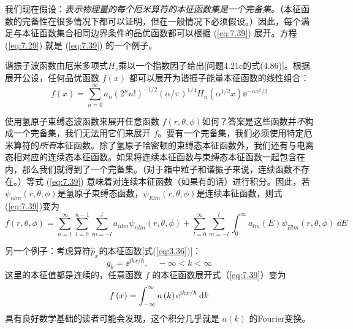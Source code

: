     我们现在假设：\textit{表示物理量的每个厄米算符的本征函数集是一个完备集。}（本征函数的完备性在很多情况下都可以证明，但在一般情况下必须假设。）因此，每个满足与本征函数集合相同边界条件的品优函数都可以根据 (\ref{eq:7.39}) 展开。方程 (\ref{eq:7.29}) 就是 (\ref{eq:7.39}) 的一个例子。

    谐振子波函数由厄米多项式$H_v$乘以一个指数因子给出[问题4.21c的式(4.86)]。根据展开公设，任何品优函数 $f\left(x\right)$ 都可以展开为谐振子能量本征函数的线性组合：
    \begin{equation*}
        f\left(x\right) = \sum_{n=0}^{\infty}a_n\left(2^nn!\right)^{-1/2}\left(\alpha/\pi\right)^{1/4}H_n\left(\alpha^{1/2}x\right)\ee ^{-\alpha x^2/2}
    \end{equation*}

    使用氢原子束缚态波函数来展开任意函数 $f\left(r,\theta,\phi\right)$如何？答案是这些函数并\textit{不}构成一个完备集，我们无法用它们来展开 $f$。要有一个完备集，我们必须使用特定厄米算符的\textit{所有}本征函数。除了氢原子哈密顿的束缚态本征函数外，我们还有与电离态相对应的连续态本征函数。如果将连续本征函数与束缚态本征函数一起包含在内，那么我们就得到了一个完备集。（对于箱中粒子和谐振子来说，连续函数不存在。）等式 (\ref{eq:7.39}) 意味着对连续本征函数（如果有的话）进行积分。因此，若$\psi_{nlm}\left(r,\theta,\phi\right)$是氢原子束缚态函数，$\psi_{Elm}\left(r,\theta,\phi\right)$是连续本征函数，则式(\ref{eq:7.39})变为
    \begin{equation*}
        f\left(r,\theta,\phi\right) = \sum_{n=1}^{\infty}\sum_{l=0}^{n-1}\sum_{m=-l}^{l}a_{nlm}\psi_{nlm}\left(r,\theta,\phi\right) + \sum_{l=0}^{\infty}\sum_{m=-l}^{l}\int_{0}^{\infty} a_{lm}\left(E\right) \psi_{Elm}\left(r,\theta,\phi\right) \:\dd E
    \end{equation*}

    另一个例子：考虑算符$\hat{p}_x$的本征函数[式(\ref{eq:3.36})]：
    \begin{equation*}
        g_k = \ee ^{\ii kx/\hbar}, \quad -\infty < k < \infty
    \end{equation*}
    这里的本征值都是连续的，任意函数 $f$ 的本征函数展开式（\ref{eq:7.39}）变为
    \begin{equation*}
        f\left(x\right) = \int_{-\infty}^{\infty}  a\left(k\right) \mathrm{e} ^{\mathrm{i} kx/\hbar} \:\dd k
    \end{equation*}
    具有良好数学基础的读者可能会发现，这个积分几乎就是 $a\left(k\right)$ 的Fourier变换。


